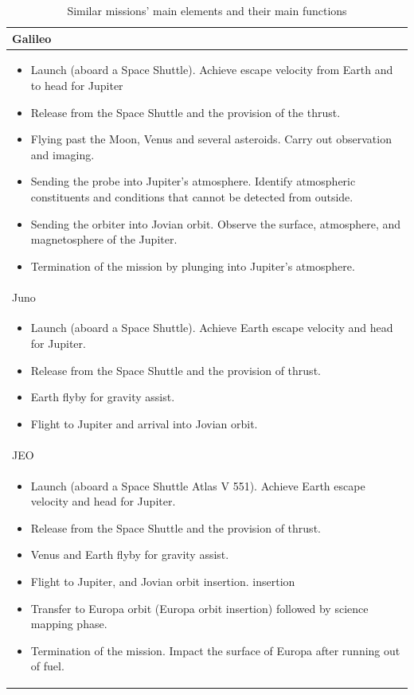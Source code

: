 \begin{longtable}{p{\textwidth}}
  \caption{Similar missions' main elements and their main functions}
  \\ \toprule

  Galileo \\* \midrule

  \begin{itemize}
  \item Launch (aboard a Space Shuttle). Achieve escape velocity from
    Earth and to head for Jupiter
  \item Release from the Space Shuttle and the provision of the
    thrust.
  \item Flying past the Moon, Venus and several asteroids. Carry out
    observation and imaging.
  \item Sending the probe into Jupiter's atmosphere. Identify
    atmospheric constituents and conditions that cannot be detected
    from outside.
  \item Sending the orbiter into Jovian orbit. Observe the surface,
    atmosphere, and magnetosphere of the Jupiter.
  \item Termination of the mission by plunging into Jupiter's
    atmosphere.
  \end{itemize} \\

  Juno \\* \midrule

  \begin{itemize}
  \item Launch (aboard a Space Shuttle). Achieve Earth escape velocity
    and head for Jupiter.
  \item Release from the Space Shuttle and the provision of thrust.
  \item Earth flyby for gravity assist.
  \item Flight to Jupiter and arrival into Jovian orbit.
  \end{itemize} \\

  JEO \\* \midrule

  \begin{itemize}
  \item Launch (aboard a Space Shuttle Atlas V 551). Achieve Earth
   escape velocity and head for Jupiter.
  \item Release from the Space Shuttle and the provision of thrust.
  \item Venus and Earth flyby for gravity assist.
  \item Flight to Jupiter, and Jovian orbit insertion.  insertion
  \item Transfer to Europa orbit (Europa orbit insertion) followed by
    science mapping phase.
  \item Termination of the mission. Impact the surface of Europa after
    running out of fuel.
  \end{itemize} \\


\end{longtable}
